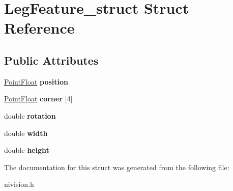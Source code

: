 \hypertarget{structLegFeature__struct}{\section{\-Leg\-Feature\-\_\-struct \-Struct \-Reference}
\label{structLegFeature__struct}
}
\subsection*{\-Public \-Attributes}
\begin{DoxyCompactItemize}
\item 
\hypertarget{structLegFeature__struct_a3544335599e5d902d294b44d79312063}{\hyperlink{structPointFloat__struct}{\-Point\-Float} {\bfseries position}}\label{structLegFeature__struct_a3544335599e5d902d294b44d79312063}

\item 
\hypertarget{structLegFeature__struct_a9a1a02a3cd2bf219c7ab34a5861c9e48}{\hyperlink{structPointFloat__struct}{\-Point\-Float} {\bfseries corner} \mbox{[}4\mbox{]}}\label{structLegFeature__struct_a9a1a02a3cd2bf219c7ab34a5861c9e48}

\item 
\hypertarget{structLegFeature__struct_a6019f8be66ba4bf09b17b58d057d07d9}{double {\bfseries rotation}}\label{structLegFeature__struct_a6019f8be66ba4bf09b17b58d057d07d9}

\item 
\hypertarget{structLegFeature__struct_a53e4389938a0cba95d01b683d6441bfd}{double {\bfseries width}}\label{structLegFeature__struct_a53e4389938a0cba95d01b683d6441bfd}

\item 
\hypertarget{structLegFeature__struct_a59ff7a95e2b828d1395a0a900f5c4085}{double {\bfseries height}}\label{structLegFeature__struct_a59ff7a95e2b828d1395a0a900f5c4085}

\end{DoxyCompactItemize}


\-The documentation for this struct was generated from the following file\-:\begin{DoxyCompactItemize}
\item 
nivision.\-h\end{DoxyCompactItemize}
